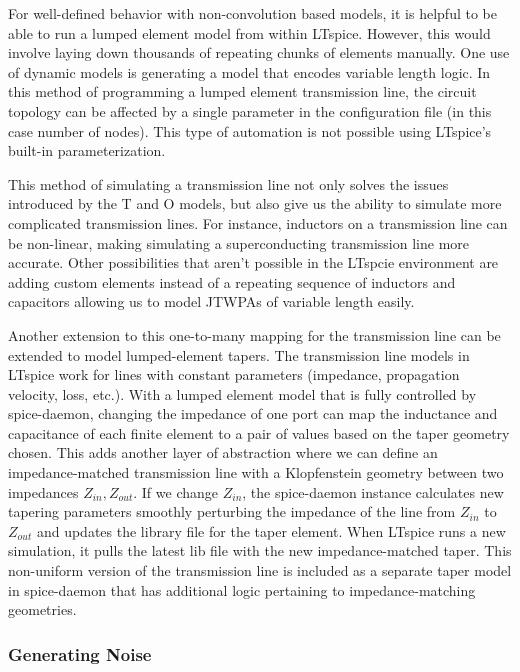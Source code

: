 \documentclass{article}
\begin{document}
For well-defined behavior with non-convolution based models, it is helpful to be able to run
a lumped element model from within LTspice. However, this would involve laying down thousands 
of repeating chunks of elements manually. One use of dynamic models is generating a model 
that encodes variable length logic. In this method of programming a lumped element transmission
line, the circuit topology can be affected by a single parameter in the configuration file 
(in this case number of nodes). This type of automation is not possible using LTspice's built-in
parameterization.

This method of simulating a transmission line not only solves the issues introduced by the
T and O models, but also give us the ability to simulate more complicated transmission lines.
For instance, inductors on a transmission line can be non-linear, making simulating a superconducting
transmission line more accurate. Other possibilities that aren't possible in the LTspcie environment
are adding custom elements instead of a repeating sequence of inductors and capacitors allowing us to
model JTWPAs of variable length easily.

Another extension to this one-to-many mapping for the transmission line can be extended to model
lumped-element tapers. The transmission line models in LTspice work for lines with constant 
parameters (impedance, propagation velocity, loss, etc.). With a lumped element model that is fully
controlled by spice-daemon, changing the impedance of one port can map the inductance and capacitance
of each finite element to a pair of values based on the taper geometry chosen. This adds another layer
of abstraction where we can define an impedance-matched transmission line with a Klopfenstein geometry
between two impedances $Z_{in}, Z_{out}$. If we change $Z_{in}$, the spice-daemon instance calculates
new tapering parameters smoothly perturbing the impedance of the line from $Z_{in}$ to $Z_{out}$ and
updates the library file for the taper element. When LTspice runs a new simulation, it pulls the latest
lib file with the new impedance-matched taper. This non-uniform version of the transmission line
is included as a separate taper model in spice-daemon that has additional logic pertaining to 
impedance-matching geometries.

\subsubsection{Generating Noise}

\end{document}
